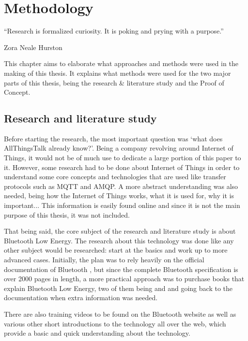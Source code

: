\documentclass[pdftex,a4paper,12pt,twoside]{report}
\begin{document}
\chapter{Methodology}
\label{ch:methodology}
\epigraph{``Research is formalized curiosity. It is poking and prying with a purpose.''}{Zora Neale Hurston}
This chapter aims to elaborate what approaches and methods were used in the making of this thesis. It explains what methods were used for the two major parts of this thesis, being the research \& literature study and the Proof of Concept.

\section{Research and literature study}
\label{sec:researchlit}
Before starting the research, the most important question was `what does AllThingsTalk already know?'. Being a company revolving around Internet of Things, it would not be of much use to dedicate a large portion of this paper to it. However, some research had to be done about Internet of Things in order to understand some core concepts and technologies that are used like transfer protocols such as MQTT and AMQP. A more abstract understanding was also needed, being how the Internet of Things works, what it is used for, why it is important... This information is easily found online and since it is not the main purpose of this thesis, it was not included.

That being said, the core subject of the research and literature study is about Bluetooth Low Energy. The research about this technology was done like any other subject would be researched: start at the basics and work up to more advanced cases. Initially, the plan was to rely heavily on the official documentation of Bluetooth \citep{bluetooth2014bluetooth}, but since the complete Bluetooth specification is over 2000 pages in length, a more practical approach was to purchase books that explain Bluetooth Low Energy, two of them being \cite{Townsend2014} and \cite{heydon2012bluetooth} and going back to the documentation when extra information was needed.

There are also training videos to be found on the Bluetooth website as well as various other short introductions to the technology all over the web, which provide a basic and quick understanding about the technology.
\end{document}
